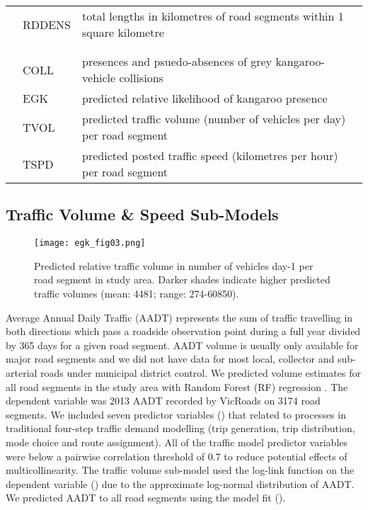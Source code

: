 \begin{table}[htp]
\begin{tabularx}{\textwidth}{llY}
           		 &RDDENS      &total lengths in kilometres of road segments within 1 square kilometre\\
&&\\
&&\\
  		 &COLL        &presences and psuedo-absences of grey kangaroo-vehicle collisions\\
           		 &EGK         &predicted relative likelihood of kangaroo presence\\
           		 &TVOL        &predicted traffic volume (number of vehicles per day) per road segment\\
           		 &TSPD        &predicted posted traffic speed (kilometres per hour) per road segment\\
\bottomrule
\end{tabularx}
\label{egk_variables}
\end{table}

\subsection{Traffic Volume \& Speed Sub-Models}

\begin{figure*}[htp]
  \centering
  \texttt{[image: egk\_fig03.png]}
  \caption[Predicted relative traffic volume in Victoria]{Predicted relative traffic volume in number of vehicles day-1 per road segment in study area. Darker shades indicate higher predicted traffic volumes (mean: 4481; range: 274-60850).}
  \label{egk_tvolmap}
\end{figure*}

Average Annual Daily Traffic (AADT) represents the sum of traffic travelling in both directions which pass a roadside observation point during a full year divided by 365 days for a given road segment. AADT volume is usually only available for major road segments and we did not have data for most local, collector and sub-arterial roads under municipal district control. We predicted volume estimates for all road segments in the study area with Random Forest (RF) regression \citep{brei01}. The dependent variable was 2013 AADT recorded by VicRoads on 3174 road segments. We included seven predictor variables () that related to processes in traditional four-step traffic demand modelling (trip generation, trip distribution, mode choice and route assignment). All of the traffic model predictor variables were below a pairwise correlation threshold of 0.7 to reduce potential effects of multicollinearity. The traffic volume sub-model used the log-link function on the dependent variable () due to the approximate log-normal distribution of AADT. We predicted AADT to all road segments using the model fit ().

